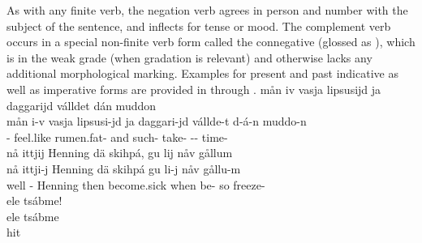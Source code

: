 As with any finite verb, the negation verb agrees in person and number with the subject of the sentence, and inflects for tense or mood. The complement verb occurs in a special non-finite verb form called the connegative (glossed as \mbox{\CONNEGs}), which is in the weak grade (when gradation is relevant) and otherwise lacks any additional morphological marking. Examples for present and past indicative as well as imperative forms are provided in  through . 
\ea\label{connegEx1}%
\glll	mån iv vasja lipsusijd ja daggarijd válldet dán muddon\\
	mån i-v vasja lipsusi-jd ja daggari-jd vállde-t d-á-n muddo-n\\
	 - feel.like\BS{} rumen.fat- and such- take- -- time-\\\nopagebreak
{}	
\z
\ea\label{connegEx2}%
\glll	nå ittjij Henning dä skihpá, gu lij nåv gållum\\
	nå ittji-j Henning dä skihpá gu li-j nåv gållu-m\\
	well - Henning\BS{} then become.sick\BS{} when be- so freeze-\\\nopagebreak
{}	
\z
\ea\label{negImpEx1}%
\glll	ele tsábme!\\
	ele tsábme\\
	\BS{} hit\BS{}\\\nopagebreak
{}	
\z




